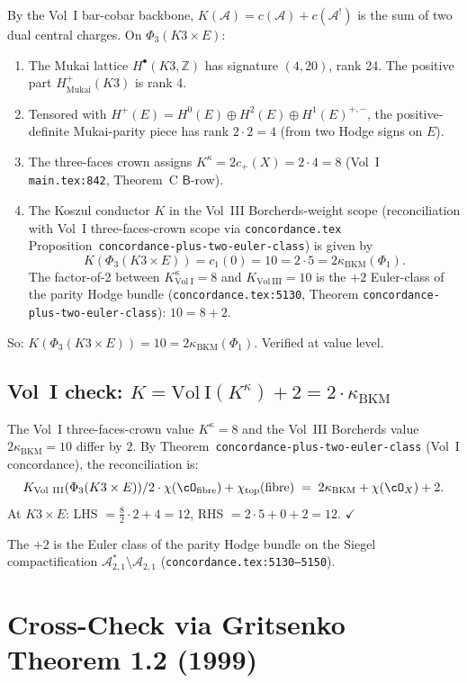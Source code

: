 \documentclass[11pt]{amsart}
\theoremstyle{definition}
\theoremstyle{remark}
\newcommand{\kBKM}{\kappa_{\mathrm{BKM}}}
\begin{document}
By the Vol~I bar-cobar backbone, $K(\mathcal{A}) = c(\mathcal{A}) + c(\mathcal{A}^!)$ is the sum
of two dual central charges. On $\Phi_3(K3 \times E)$:
\begin{enumerate}[label=(\alph*)]
\item The Mukai lattice $H^\bullet(K3, \mathbb{Z})$ has signature $(4, 20)$, rank 24. The positive
part $H^+_{\mathrm{Mukai}}(K3)$ is rank 4.
\item Tensored with $H^+(E) = H^0(E) \oplus H^2(E) \oplus H^1(E)^{+,-}$, the positive-definite
Mukai-parity piece has rank $2 \cdot 2 = 4$ (from two Hodge signs on $E$).
\item The three-faces crown assigns $K^\kappa = 2 c_+(X) = 2 \cdot 4 = 8$ (Vol~I
\texttt{main.tex:842}, Theorem~C $\mathsf{B}$-row).
\item The Koszul conductor $K$ in the Vol~III Borcherds-weight scope (reconciliation with
Vol~I three-faces-crown scope via
\texttt{concordance.tex} Proposition~\texttt{concordance-plus-two-euler-class}) is given by
\[
K(\Phi_3(K3 \times E)) = c_1(0) = 10 = 2 \cdot 5 = 2 \kBKM(\Phi_1).
\]
The factor-of-2 between $K^\kappa_{\mathrm{Vol~I}} = 8$ and $K_{\mathrm{Vol~III}} = 10$ is the
$+2$ Euler-class of the parity Hodge bundle
(\texttt{concordance.tex:5130}, Theorem
\texttt{concordance-plus-two-euler-class}): $10 = 8 + 2$.
\end{enumerate}

So: $K(\Phi_3(K3 \times E)) = 10 = 2 \kBKM(\Phi_1)$. Verified at value level.

\subsection{Vol~I check: $K = \mathrm{Vol~I}(K^\kappa) + 2 = 2 \cdot \kBKM$}

The Vol~I three-faces-crown value $K^\kappa = 8$ and the Vol~III Borcherds value $2 \kBKM = 10$
differ by $2$. By Theorem~\texttt{concordance-plus-two-euler-class} (Vol~I concordance), the
reconciliation is:
\[
K_{\mathrm{Vol~III}}(\Phi_3(K3 \times E))/2 \cdot \chi(\cO_{\mathrm{fibre}}) + \chi_{\mathrm{top}}(\mathrm{fibre})
\;=\; 2 \kBKM + \chi(\cO_X) + 2.
\]
At $K3 \times E$: LHS $= \frac{8}{2} \cdot 2 + 4 = 12$, RHS $= 2 \cdot 5 + 0 + 2 = 12$. $\checkmark$

The $+2$ is the Euler class of the parity Hodge bundle on the Siegel compactification
$\mathcal{A}_{2,1}^* \setminus \mathcal{A}_{2,1}$
(\texttt{concordance.tex:5130--5150}).

\section{Cross-Check via Gritsenko Theorem 1.2 (1999)}
\end{document}
